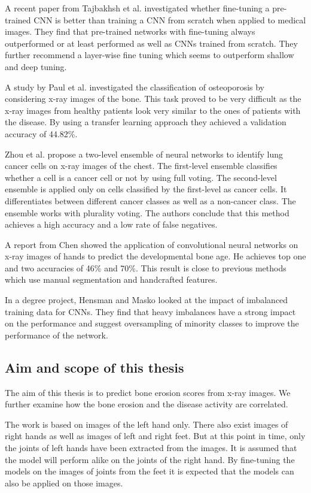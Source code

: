 \documentclass[12pt]{article}
\begin{document}
A recent paper from Tajbakhsh et al. \cite{tajbakhsh_2017} investigated whether fine-tuning a pre-trained CNN is better than training a CNN from scratch when applied to medical images. They find that pre-trained networks with fine-tuning always outperformed or at least performed as well as CNNs trained from scratch. They further recommend a layer-wise fine tuning which seems to outperform shallow and deep tuning.

A study by Paul et al. \cite{paul_2017} investigated the classification of osteoporosis by considering x-ray images of the bone. This task proved to be very difficult as the x-ray images from healthy patients look very similar to the ones of patients with the disease. By using a transfer learning approach they achieved a validation accuracy of 44.82\%.

Zhou et al. \cite{zhou_2002} propose a two-level ensemble of neural networks to identify lung cancer cells on x-ray images of the chest. The first-level ensemble classifies whether a cell is a cancer cell or not by using full voting. The second-level ensemble is applied only on cells classified by the first-level as cancer cells. It differentiates between different cancer classes as well as a non-cancer class. The ensemble works with plurality voting. The authors conclude that this method achieves a high accuracy and a low rate of false negatives.

A report from Chen \cite{chen_2016} showed the application of convolutional neural networks on x-ray images of hands to predict the developmental bone age. He achieves top one and two accuracies of 46\% and 70\%. This result is close to previous methods which use manual segmentation and handcrafted features.

In a degree project, Hensman and Masko \cite{hensman_2015} looked at the impact of imbalanced training data for CNNs. They find that heavy imbalances have a strong impact on the performance and suggest oversampling of minority classes to improve the performance of the network.

\subsection{Aim and scope of this thesis}

The aim of this thesis is to predict bone erosion scores from x-ray images. We further examine how the bone erosion and the disease activity are correlated.

The work is based on images of the left hand only. There also exist images of right hands as well as images of left and right feet. But at this point in time, only the joints of left hands have been extracted from the images. It is assumed that the model will perform alike on the joints of the right hand. By fine-tuning the models on the images of joints from the feet it is expected that the models can also be applied on those images.
\end{document}

